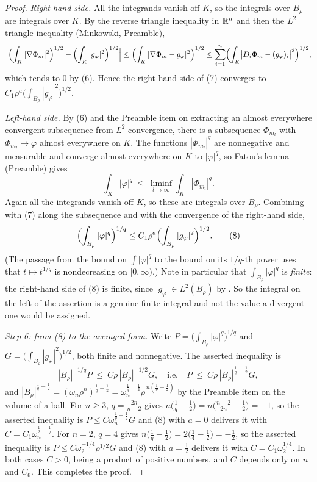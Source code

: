 \begin{proof}
\emph{Right-hand side.}  All the integrands vanish off $K$, so the integrals
over $B_\rho$ are integrals over $K$.  By the reverse triangle inequality in
$\mathbb{R}^n$ and then the $L^2$ triangle inequality (Minkowski, Preamble),
\[
\Bigl|\Bigl(\int_K|\nabla\Phi_m|^2\Bigr)^{1/2}
-\Bigl(\int_K|g_\varphi|^2\Bigr)^{1/2}\Bigr|
\le\Bigl(\int_K|\nabla\Phi_m-g_\varphi|^2\Bigr)^{1/2}
\le\sum_{i=1}^n\Bigl(\int_K\bigl|D_i\Phi_m-(g_\varphi)_i\bigr|^2\Bigr)^{1/2},
\]
which tends to $0$ by (6).  Hence the right-hand side of (7) converges to
$C_1\rho^{a}\bigl(\int_{B_\rho}|g_\varphi|^2\bigr)^{1/2}$.

\emph{Left-hand side.}  By (6) and the Preamble item on extracting an almost
everywhere convergent subsequence from $L^2$ convergence, there is a
subsequence $\Phi_{m_l}$ with $\Phi_{m_l}\to\varphi$ almost everywhere on $K$.
The functions $|\Phi_{m_l}|^{q}$ are nonnegative and measurable and converge
almost everywhere on $K$ to $|\varphi|^{q}$, so Fatou's lemma (Preamble) gives
\[
\int_K|\varphi|^{q}\ \le\ \liminf_{l\to\infty}\int_K|\Phi_{m_l}|^{q} .
\]
Again all the integrands vanish off $K$, so these are integrals over $B_\rho$.
Combining with (7) along the subsequence and with the convergence of the
right-hand side,
\[
\Bigl(\int_{B_\rho}|\varphi|^{q}\Bigr)^{1/q}
\le C_1\rho^{a}\Bigl(\int_{B_\rho}|g_\varphi|^2\Bigr)^{1/2}.
\tag{8}
\]
(The passage from the bound on $\int|\varphi|^q$ to the bound on its $1/q$-th
power uses that $t\mapsto t^{1/q}$ is nondecreasing on $[0,\infty)$.)  Note in
particular that $\int_{B_\rho}|\varphi|^q$ is \emph{finite}: the right-hand side
of (8) is finite, since $|g_\varphi|\in L^2(B_\rho)$ by .  So
the integral on the left of the assertion is a genuine finite integral and not
the value a divergent one would be assigned.

\emph{Step 6: from (8) to the averaged form.}  Write
$P=\bigl(\int_{B_\rho}|\varphi|^q\bigr)^{1/q}$ and
$G=\bigl(\int_{B_\rho}|g_\varphi|^2\bigr)^{1/2}$, both finite and nonnegative.
The asserted inequality is
\[
|B_\rho|^{-1/q}P\ \le\ C\rho\,|B_\rho|^{-1/2}G ,
\quad\text{i.e.}\quad
P\ \le\ C\rho\,|B_\rho|^{\frac1q-\frac12}G ,
\]
and $|B_\rho|^{\frac1q-\frac12}=(\omega_n\rho^n)^{\frac1q-\frac12}
=\omega_n^{\frac1q-\frac12}\rho^{\,n(\frac1q-\frac12)}$ by the Preamble item on
the volume of a ball.  For $n\ge3$, $q=\frac{2n}{n-2}$ gives
$n\bigl(\frac1q-\frac12\bigr)=n\bigl(\frac{n-2}{2n}-\frac12\bigr)=-1$, so the
asserted inequality is $P\le C\omega_n^{\frac1q-\frac12}G$ and (8) with $a=0$
delivers it with $C=C_1\omega_n^{\frac12-\frac1q}$.  For $n=2$, $q=4$ gives
$n\bigl(\frac1q-\frac12\bigr)=2\bigl(\frac14-\frac12\bigr)=-\tfrac12$, so the
asserted inequality is $P\le C\omega_2^{-1/4}\rho^{1/2}G$ and (8) with
$a=\tfrac12$ delivers it with $C=C_1\omega_2^{1/4}$.  In both cases $C>0$,
being a product of positive numbers, and $C$ depends only on $n$ and $C_6$.
This completes the proof.
\end{proof}
